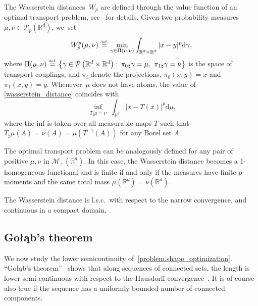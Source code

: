 \documentclass[10pt]{amsart}
\theoremstyle{definition}
\newcommand{\eqdef}{\ensuremath{\stackrel{\mbox{\upshape\tiny def.}}{=}}}
\newcommand{\RR}{\mathbb{R}}
\newcommand\dd{\mathrm{d}}
\begin{document}
The Wasserstein distan\-ces~$W_p$ are defined through the value function of an optimal transport problem, see~\cite{ambrosio2008gradient,santambrogio2015optimal,villani2009optimal} for details. Given two probability measures $\mu, \nu \in \mathcal{P}_p(\RR^d)$, we~set
\begin{equation}\label{wasserstein_distance}
W_p^p(\mu, \nu)
\eqdef
\min_{\gamma \in \Pi(\mu, \nu)}
\int_{\RR^d\times \RR^d} |x - y|^p\dd\gamma,
\end{equation}
where
$\Pi(\mu, \nu) \eqdef
\left\{
\gamma \in \mathcal{P}\left(\RR^d\times \RR^d\right) :
\,
{\pi_{0}}_\sharp\gamma = \mu, \
{\pi_{1}}_\sharp\gamma = \nu
\right\}
$
is the space of transport couplings, and $\pi_i$ denote the projections, \ie $\pi_0(x,y) = x$ and $\pi_1(x,y) = y$. Whenever~$\mu$ does not have atoms, the value of \eqref{wasserstein_distance} coincides with
\begin{equation}\label{wasserstein_distance.monge}
\inf_{
\substack{
T_{\sharp}\mu = \nu
}
}
\int_{\RR^d} |x - T(x)|^p\dd \mu,
\end{equation}
where the inf is taken over all measurable maps $T$ such that $T_\sharp\mu(A) = \nu(A) = \mu(T^{-1}(A))$ for any Borel set $A$.

The optimal transport problem can be analogously defined for any pair of positive $\mu, \nu$ in $\mathcal{M}_+(\RR^d)$. In this case, the Wasserstein distance becomes a 1-homogeneous functional and is finite if and only if the measures have finite $p$-moments and the same total mass $\mu(\RR^d) = \nu(\RR^d)$.

The Wasserstein distance is l.s.c.~with respect to the narrow convergence, and continuous in a compact domain, \cite[Lem.\,4.3]{villani2009optimal}.

\newcommand{\Golab}{Go\l\k{a}b}
\subsection{\Golab's theorem}
We now study the lower semicontinuity of~\eqref{problem.shape_optimization}.
``\Golab's theorem''~\cite{Golab} shows that along sequences of connected sets, the length is lower semi-continuous with respect to the Hausdorff convergence~\cite[Chap.\,10]{morel2012variational}.
It is of course also true if the sequence has a uniformly bounded number of connected components.
\end{document}
